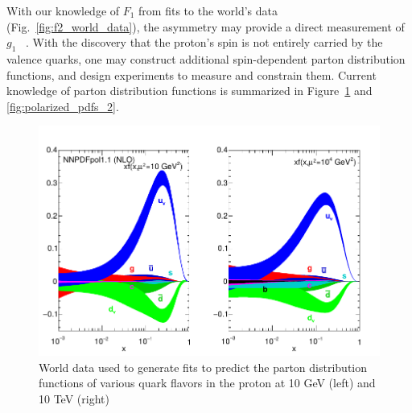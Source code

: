 {\noindent}With our knowledge of $F_1$ from fits to the world's data
(Fig.~\ref{fig:f2_world_data}), the asymmetry may provide a direct measurement
of $g_1$ ~\cite{DeFlorian2009}. With the discovery that the proton's spin is not
entirely carried by the valence quarks, one may construct additional
spin-dependent parton distribution functions, and design experiments to measure
and constrain them. Current knowledge of parton distribution functions is
summarized in Figure~\ref{fig:polarized_pdfs_1} and \ref{fig:polarized_pdfs_2}.

\begin{figure}[ht]
  \centering
  \includegraphics[width=0.7\linewidth]{./figures/polarized_pdfs.pdf}
  \caption{
    World data used to generate fits to predict the parton distribution
    functions of various quark flavors in the proton at 10 GeV (left) and 10
    TeV (right)~\cite{ReviewEidelman2012}
  }
  \label{fig:polarized_pdfs_1}
\end{figure}

